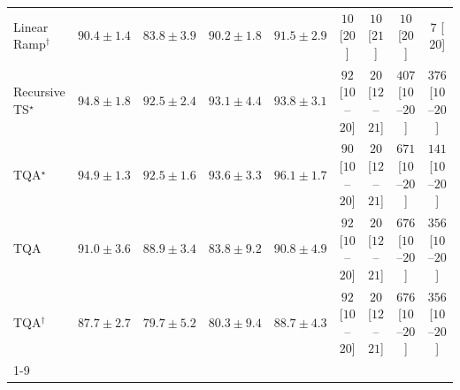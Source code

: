 \begin{tabular}{l|cccc|cccc|}
Linear Ramp$^\dagger$ & {\cellcolor[HTML]{04629A}} \color[HTML]{F1F1F1} $90.4\pm 1.4$ & {\cellcolor[HTML]{2081B9}} \color[HTML]{F1F1F1} $83.8\pm 3.9$ & {\cellcolor[HTML]{04639B}} \color[HTML]{F1F1F1} $90.2\pm 1.8$ & {\cellcolor[HTML]{045E94}} \color[HTML]{F1F1F1} $91.5\pm 2.9$ & {\cellcolor[HTML]{FFF6F2}} \color[HTML]{000000} $10$ [$20$] & {\cellcolor[HTML]{FFF6F2}} \color[HTML]{000000} $10$ [$21$] & {\cellcolor[HTML]{FFF6F2}} \color[HTML]{000000} $10$ [$20$] & {\cellcolor[HTML]{FFF6F2}} \color[HTML]{000000} $7$ [$20$] \\
Recursive TS$^\star$ & {\cellcolor[HTML]{034D79}} \color[HTML]{F1F1F1} $94.8\pm 1.8$ & {\cellcolor[HTML]{045A8D}} \color[HTML]{F1F1F1} $92.5\pm 2.4$ & {\cellcolor[HTML]{045788}} \color[HTML]{F1F1F1} $93.1\pm 4.4$ & {\cellcolor[HTML]{045382}} \color[HTML]{F1F1F1} $93.8\pm 3.1$ & {\cellcolor[HTML]{FDE1DE}} \color[HTML]{000000} $92$ [$10$--$20$] & {\cellcolor[HTML]{FFF3EF}} \color[HTML]{000000} $20$ [$12$--$21$] & {\cellcolor[HTML]{F35F9F}} \color[HTML]{F1F1F1} $407$ [$10$--$20$] & {\cellcolor[HTML]{F770A4}} \color[HTML]{F1F1F1} $376$ [$10$--$20$] \\
TQA$^\star$ & {\cellcolor[HTML]{034C78}} \color[HTML]{F1F1F1} $94.9\pm 1.3$ & {\cellcolor[HTML]{045A8D}} \color[HTML]{F1F1F1} $92.5\pm 1.6$ & {\cellcolor[HTML]{045483}} \color[HTML]{F1F1F1} $93.6\pm 3.3$ & {\cellcolor[HTML]{03456C}} \color[HTML]{F1F1F1} $96.1\pm 1.7$ & {\cellcolor[HTML]{FDE2DF}} \color[HTML]{000000} $90$ [$10$--$20$] & {\cellcolor[HTML]{FFF3EF}} \color[HTML]{000000} $20$ [$12$--$21$] & {\cellcolor[HTML]{7D0177}} \color[HTML]{F1F1F1} $671$ [$10$--$20$] & {\cellcolor[HTML]{FDD4D0}} \color[HTML]{000000} $141$ [$10$--$20$] \\
TQA & {\cellcolor[HTML]{046097}} \color[HTML]{F1F1F1} $91.0\pm 3.6$ & {\cellcolor[HTML]{0568A3}} \color[HTML]{F1F1F1} $88.9\pm 3.4$ & {\cellcolor[HTML]{2081B9}} \color[HTML]{F1F1F1} $83.8\pm 9.2$ & {\cellcolor[HTML]{046198}} \color[HTML]{F1F1F1} $90.8\pm 4.9$ & {\cellcolor[HTML]{FDE1DE}} \color[HTML]{000000} $92$ [$10$--$20$] & {\cellcolor[HTML]{FFF3EF}} \color[HTML]{000000} $20$ [$12$--$21$] & {\cellcolor[HTML]{7C0177}} \color[HTML]{F1F1F1} $676$ [$10$--$20$] & {\cellcolor[HTML]{F87AA8}} \color[HTML]{F1F1F1} $356$ [$10$--$20$] \\
TQA$^\dagger$ & {\cellcolor[HTML]{056DAB}} \color[HTML]{F1F1F1} $87.7\pm 2.7$ & {\cellcolor[HTML]{4697C4}} \color[HTML]{F1F1F1} $79.7\pm 5.2$ & {\cellcolor[HTML]{3F93C2}} \color[HTML]{F1F1F1} $80.3\pm 9.4$ & {\cellcolor[HTML]{0569A4}} \color[HTML]{F1F1F1} $88.7\pm 4.3$ & {\cellcolor[HTML]{FDE1DE}} \color[HTML]{000000} $92$ [$10$--$20$] & {\cellcolor[HTML]{FFF3EF}} \color[HTML]{000000} $20$ [$12$--$21$] & {\cellcolor[HTML]{7C0177}} \color[HTML]{F1F1F1} $676$ [$10$--$20$] & {\cellcolor[HTML]{F87AA8}} \color[HTML]{F1F1F1} $356$ [$10$--$20$] \\
\cline{1-9}
\bottomrule
\end{tabular}
